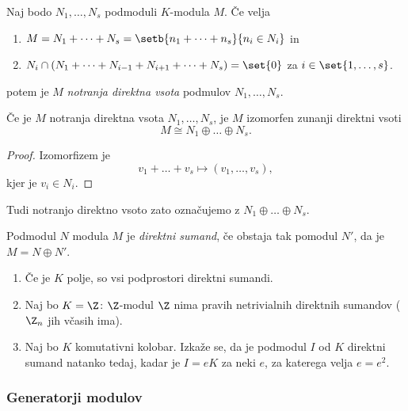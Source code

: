 Naj bodo $N_1, \dots, N_s$ podmoduli $K$-modula $M$. Če velja 
\begin{enumerate}
    \item $M = N_1 + \dots + N_s = \setb{n_1 + \dots + n_s}{n_i \in N_i}$ in
    \item $N_i \cap (N_1 +  \dots + N_{i-1} + N_{i+1} + \dots + N_s) = \set{0}$ za 
    $i \in \set{1, \dots, s}$.
\end{enumerate}
potem je $M$ \emph{notranja direktna vsota} podmulov $N_1, \dots, N_s$.

\begin{trditev}
    Če je $M$ notranja direktna vsota $N_1, \dots, N_s$, je 
    $M$ izomorfen zunanji direktni vsoti
    \[
        M \cong N_1 \oplus \dots \oplus N_s.
    \] 
\end{trditev}

\begin{proof}
    Izomorfizem je 
    \[
        v_1 + \dots + v_s \mapsto (v_1, \dots, v_s),
    \]
    kjer je $v_i \in N_i$.
\end{proof}

\begin{opomba}
    Tudi notranjo direktno vsoto zato označujemo z 
    $N_1 \oplus \dots \oplus N_s$.
\end{opomba}

\begin{definicija}
    Podmodul $N$ modula $M$ je \emph{direktni sumand},
    če obstaja tak pomodul $N'$, da je $M = N \oplus N'$.
\end{definicija}

\begin{primer}
    \begin{enumerate}
        \item Če je $K$ polje, so vsi podprostori direktni sumandi.
        \item Naj bo $K = \Z$: $\Z$-modul $\Z$ nima pravih netrivialnih 
        direktnih sumandov ($\Z_n$ jih včasih ima).
        \item Naj bo $K$ komutativni kolobar. Izkaže se, da je podmodul $I$ 
        od $K$ direktni sumand natanko tedaj, kadar je $I = eK$ za neki 
        $e$, za katerega velja $e = e^2$. 
    \end{enumerate}
\end{primer}

\subsubsection*{Generatorji modulov}

